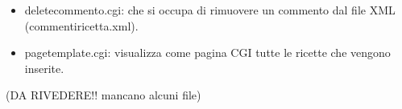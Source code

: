 \documentclass[12pt]{article}
\begin{document}
\begin{itemize}
				\begin{itemize} \item deletecommento.cgi: che si occupa di rimuovere un commento dal file XML (commentiricetta.xml).
				\end{itemize}
				
				\begin{itemize} \item pagetemplate.cgi: visualizza come pagina CGI tutte le ricette che vengono inserite.
				\end{itemize}
				(DA RIVEDERE!! mancano alcuni file)
				
			\end{itemize}
			
				
		
	
	
\end{document}
